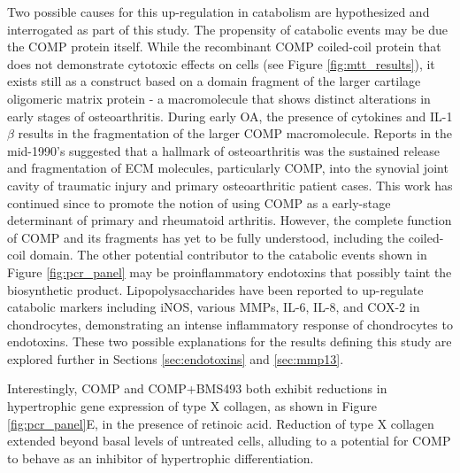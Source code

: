\begin{refsection}
Two possible causes for this up-regulation in catabolism are hypothesized and
interrogated as part of this study. The propensity of catabolic events may be
due the COMP protein itself. While the recombinant COMP coiled-coil protein that
does not demonstrate cytotoxic effects on cells (see Figure
\ref{fig:mtt_results}), it exists still as a construct based on a domain
fragment of the larger cartilage oligomeric matrix protein - a macromolecule
that shows distinct alterations in early stages of osteoarthritis. During early
OA, the presence of cytokines and IL-1${\beta}$ results in the fragmentation of
the larger COMP macromolecule.\cite{Heinegard2011} Reports in the mid-1990's
suggested that a hallmark of osteoarthritis was the sustained release and
fragmentation of ECM molecules, particularly COMP, into the synovial joint
cavity of traumatic injury and primary osteoarthritic patient
cases.\cite{Lohmander1994,DiCesare2002,Pichika2004} This work has continued
since to promote the notion of using COMP as a early-stage determinant of
primary and rheumatoid arthritis.\cite{Vilim1997,Vilim2002,Heinegard2011}
However, the complete function of COMP and its fragments has yet to be fully
understood, including the coiled-coil domain. The other potential contributor to
the catabolic events shown in Figure \ref{fig:pcr_panel} may be proinflammatory
endotoxins that possibly taint the biosynthetic product. Lipopolysaccharides
have been reported to up-regulate catabolic markers including iNOS, various
MMPs, IL-6, IL-8, and COX-2 in chondrocytes, demonstrating an intense
inflammatory response of chondrocytes to
endotoxins.\cite{Lotz1992,Geng1995,Malemud2013,Guerne1990,Murrell1995} These two
possible explanations for the results defining this study are explored further
in Sections \ref{sec:endotoxins} and \ref{sec:mmp13}.


Interestingly, COMP and COMP+BMS493 both exhibit reductions
in hypertrophic gene expression of type X collagen, as shown in Figure
\ref{fig:pcr_panel}E, in the presence of retinoic acid. Reduction of type X
collagen extended beyond basal levels of untreated cells, alluding to a
potential for COMP to behave as an inhibitor of hypertrophic differentiation.


\end{refsection}
